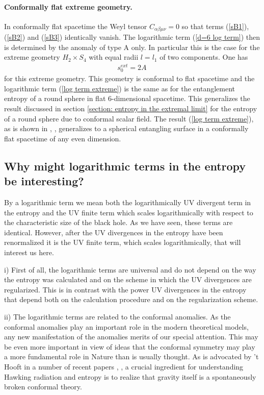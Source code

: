 \documentclass[12pt]{article}
\def\be{\begin{eqnarray}}
\def\ee{\end{eqnarray}}
\def\lb{\label}
\begin{document}
\paragraph*{Conformally flat extreme geometry.} In conformally flat spacetime the Weyl tensor $C_{\alpha\beta\mu\nu}=0$ so that terms   (\ref{sB1}), (\ref{sB2}) and (\ref{sB3}) identically vanish. The logarithmic term (\ref{d=6 log term}) then is determined by the anomaly of type A only.
In particular this is the case for the extreme geometry
$H_2\times S_4$  with equal radii $l=l_1$ of two components. One has
\be
s_0^{ext}=2A\, 
\lb{log term extreme}
\ee
for this extreme geometry.
This geometry is conformal to flat  spacetime and the logarithmic term   (\ref{log term extreme})  is the same as for  the entanglement entropy                       
of a round sphere in flat 6-dimensional spacetime. This generalizes the result discussed in section \ref{section: entropy in the extremal limit} for the entropy of a round sphere due to conformal scalar field.
The result (\ref{log term extreme}),  as is shown in \cite{Casini:2011kv}, \cite{Myers:2010tj},  generalizes to a spherical entangling surface in a conformally flat spacetime of  any even dimension.


\subsection{Why might logarithmic terms in the entropy  be interesting?}

By a  logarithmic term we  mean both the logarithmically UV divergent term in the entropy  and the UV finite term which scales logarithmically with respect to the
characteristic size of the black hole. As we have seen, these terms are  identical. However, after the  UV divergences in the entropy have been renormalized  it is the UV finite term, which scales logarithmically,  that will interest us here. 

\medskip

\noindent i) First of all, the logarithmic terms are universal and do not depend on the way the entropy was calculated and on the scheme 
in which the UV divergences are  regularized.
This is in contrast with the power UV divergences in the entropy that depend both on the calculation procedure and on the  regularization scheme.

\medskip

\noindent ii)  The logarithmic terms are related to the conformal anomalies. As the conformal anomalies play an important role in the modern 
theoretical models, any new manifestation of the anomalies merits of our special attention. This may be even more important in view of ideas that 
the conformal symmetry may play a more fundamental role in Nature
than is usually thought. As is advocated by 't Hooft in a number of recent papers \cite{Hooft:2010nc}, \cite{Hooft:2010ac}, \cite{'tHooft:2009ms} 
a crucial ingredient for  understanding  Hawking radiation and entropy is to realize that gravity itself is a
spontaneously broken conformal theory. 
\end{document}

